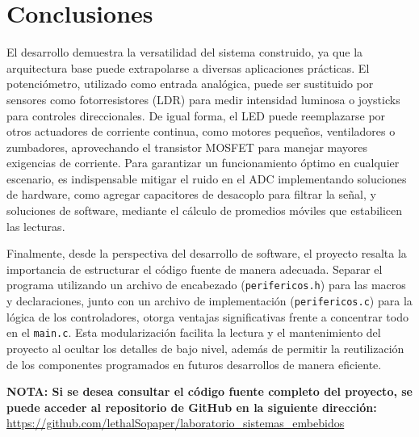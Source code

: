 \documentclass[12pt, letterpaper]{article}
\begin{document}
\section*{\centering \fontsize{14}{17}\sffamily\selectfont Conclusiones}

El desarrollo demuestra la versatilidad del sistema construido, ya que la arquitectura base puede extrapolarse a diversas aplicaciones prácticas. El potenciómetro, utilizado como entrada analógica, puede ser sustituido por sensores como fotorresistores (LDR) para medir intensidad luminosa o joysticks para controles direccionales. De igual forma, el LED puede reemplazarse por otros actuadores de corriente continua, como motores pequeños, ventiladores o zumbadores, aprovechando el transistor MOSFET para manejar mayores exigencias de corriente. Para garantizar un funcionamiento óptimo en cualquier escenario, es indispensable mitigar el ruido en el ADC implementando soluciones de hardware, como agregar capacitores de desacoplo para filtrar la señal, y soluciones de software, mediante el cálculo de promedios móviles que estabilicen las lecturas.

Finalmente, desde la perspectiva del desarrollo de software, el proyecto resalta la importancia de estructurar el código fuente de manera adecuada. Separar el programa utilizando un archivo de encabezado (\texttt{perifericos.h}) para las macros y declaraciones, junto con un archivo de implementación (\texttt{perifericos.c}) para la lógica de los controladores, otorga ventajas significativas frente a concentrar todo en el \texttt{main.c}. Esta modularización facilita la lectura y el mantenimiento del proyecto al ocultar los detalles de bajo nivel, además de permitir la reutilización de los componentes programados en futuros desarrollos de manera eficiente.

% 

\newpage
\textbf{NOTA: Si se desea consultar el código fuente completo del proyecto, se puede acceder al repositorio de GitHub en la siguiente dirección:} \url{https://github.com/lethalSopaper/laboratorio_sistemas_embebidos}
\end{document}
